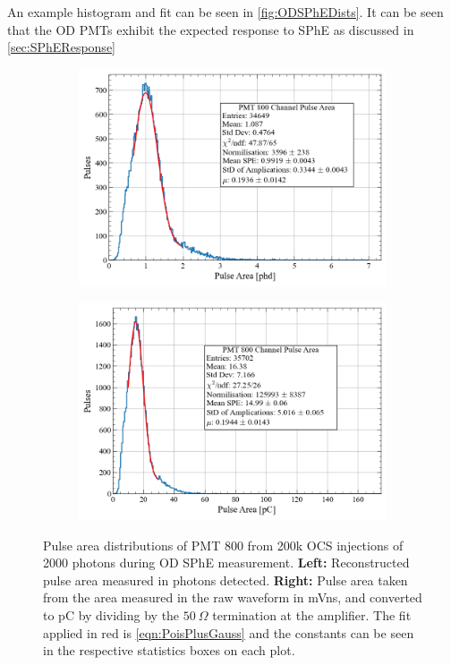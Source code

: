 An example histogram and fit can be seen in \autoref{fig:ODSPhEDists}. It can be seen that the OD PMTs exhibit the expected response to SPhE as discussed in \autoref{sec:SPhEResponse}

\begin{figure}
     \centering
     \begin{subfigure}[b]{0.47\textwidth}
         \centering
         \includegraphics[width=\textwidth]{figures/ODCommissioning/PMT800_PulseArea_Distribution.png}
         \caption{}
         \label{fig:ODSPhE_phd}
     \end{subfigure}
     \begin{subfigure}[b]{0.47\textwidth}
         \centering
         \includegraphics[width=\textwidth]{figures/ODCommissioning/PMT800_PulseArea_Distribution_pC.png}
         \caption{}
         \label{fig:ODSPhE_pC}
     \end{subfigure}
        \caption{Pulse area distributions of PMT 800 from 200k OCS injections of 2000 photons during OD SPhE measurement. \textbf{Left:} Reconstructed pulse area measured in photons detected. \textbf{Right:} Pulse area taken from the area measured in the raw waveform in mVns, and converted to pC by dividing by the $50~\Omega$ termination at the amplifier. The fit applied in red is \autoref{eqn:PoisPlusGauss} and the constants can be seen in the respective statistics boxes on each plot.}
        \label{fig:ODSPhEDists}
\end{figure}
